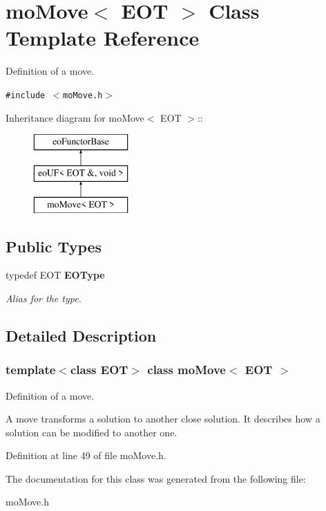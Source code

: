 \section{moMove$<$ EOT $>$ Class Template Reference}
\label{classmo_move}
Definition of a move.  


{\tt \#include $<$moMove.h$>$}

Inheritance diagram for moMove$<$ EOT $>$::\begin{figure}[H]
\begin{center}
\leavevmode
\includegraphics[height=3cm]{classmo_move}
\end{center}
\end{figure}
\subsection*{Public Types}
\begin{CompactItemize}
\item 
typedef EOT {\bf EOType}\label{classmo_move_7fb853a91ba1319530529e515380bbba}

\begin{CompactList}\small\item\em Alias for the type. \item\end{CompactList}\end{CompactItemize}


\subsection{Detailed Description}
\subsubsection*{template$<$class EOT$>$ class moMove$<$ EOT $>$}

Definition of a move. 

A move transforms a solution to another close solution. It describes how a solution can be modified to another one. 

Definition at line 49 of file moMove.h.

The documentation for this class was generated from the following file:\begin{CompactItemize}
\item 
moMove.h\end{CompactItemize}
